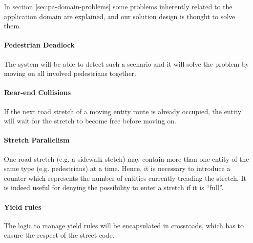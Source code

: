 In section \ref{sec:pa-domain-problems} some problems 
inherently related to the application domain are explained, 
and our solution design is thought to solve them.

\paragraph{Pedestrian Deadlock}
The system will be able to detect such a scenario
and it will solve the problem by moving on
all involved pedestrians together.

\paragraph{Rear-end Collisions} 
If the next road stretch of a moving entity route is already occupied,
the entity will wait for the stretch to become free before moving on.

\paragraph{Stretch Parallelism} 
One road stretch (e.g. a sidewalk stetch) may contain more 
than one entity of the same type (e.g. pedestrians) at a time.
Hence, it is necessary to introduce a counter which represents
the number of entities currently treading the stretch.
It is indeed useful for denying the possibility to enter a stretch if it is ``full''.

\paragraph{Yield rules} 
The logic to manage yield rules will be encapsulated in crossroads, 
which has to ensure the respect of the street code.
